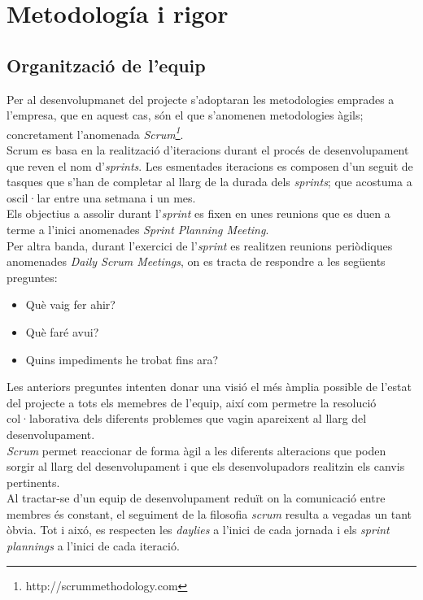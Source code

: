 \section{Metodología i rigor}

\subsection{Organització de l'equip}

Per al desenvolupmanet del projecte s'adoptaran les metodologies emprades a l'empresa, que en aquest cas, són el que s'anomenen metodologies àgils; concretament l'anomenada \textit{Scrum\footnote{http://scrummethodology.com}}.\\
Scrum es basa en la realització d'iteracions durant el procés de desenvolupament que reven el nom d'\textit{sprints}. Les esmentades iteracions es composen d'un seguit de tasques que s'han de completar al llarg de la durada dels \textit{sprints}; que acostuma a oscil·lar entre una setmana i un mes.\\
Els objectius a assolir durant l'\textit{sprint} es fixen en unes reunions que es duen a terme a l'inici anomenades \textit{Sprint Planning Meeting}.\\
Per altra banda, durant l'exercici de l'\textit{sprint} es realitzen reunions periòdiques anomenades \textit{Daily Scrum Meetings}, on es tracta de respondre a les següents preguntes:

\begin{itemize}
	\item Què vaig fer ahir?
	\item Què faré avui?
	\item Quins impediments he trobat fins ara?
\end{itemize}
Les anteriors preguntes intenten donar una visió el més àmplia possible de l'estat del projecte a tots els memebres de l'equip, així com permetre la resolució col·laborativa dels diferents problemes que vagin apareixent al llarg del desenvolupament.\\
\textit{Scrum} permet reaccionar de forma àgil a les diferents alteracions que poden sorgir al llarg del desenvolupament i que els desenvolupadors realitzin els canvis pertinents.\\
Al tractar-se d'un equip de desenvolupament reduït on la comunicació entre membres és constant, el seguiment de la filosofia \textit{scrum} resulta a vegadas un tant òbvia. Tot i aixó, es respecten les \textit{daylies} a l'inici de cada jornada i els \textit{sprint plannings} a l'inici de cada iteració.

